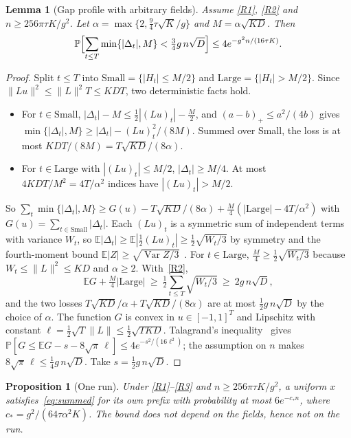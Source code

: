 \documentclass[11pt,a4paper]{article}
\newtheorem{lemma}[theorem]{Lemma}
\newtheorem{proposition}[theorem]{Proposition}
\theoremstyle{definition}
\theoremstyle{remark}
\newcommand{\E}{\mathbb E}
\newcommand{\Prb}{\mathbb P}
\begin{document}
\begin{lemma}[Gap profile with arbitrary fields]\label{lem:profile}
Assume \eqref{R1}, \eqref{R2} and $n\ge256\pi\tau K/g^2$. Let
$\alpha=\max\{2,\frac94\tau\sqrt K/g\}$ and $M=\alpha\sqrt{KD}$. Then
\[
 \Prb\Bigl[\sum_{t\le T}\min\{|\Delta_t|,M\}<\tfrac34g\,n\sqrt D\Bigr]
 \le4e^{-g^2n/(16\tau K)} .
\]
\end{lemma}

\begin{proof}
Split $t\le T$ into $\mathrm{Small}=\{|H_t|\le M/2\}$ and
$\mathrm{Large}=\{|H_t|>M/2\}$. Since $\|Lu\|^2\le\|L\|^2T\le KDT$, two
deterministic facts hold.
\begin{itemize}
 \item For $t\in\mathrm{Small}$, $|\Delta_t|-M\le\frac12|(Lu)_t|-\frac M2$,
 and $(a-b)_+\le a^2/(4b)$ gives
 $\min\{|\Delta_t|,M\}\ge|\Delta_t|-(Lu)_t^2/(8M)$. Summed over Small, the
 loss is at most $KDT/(8M)=T\sqrt{KD}/(8\alpha)$.
 \item For $t\in\mathrm{Large}$ with $|(Lu)_t|\le M/2$,
 $|\Delta_t|\ge M/4$. At most $4KDT/M^2=4T/\alpha^2$ indices have
 $|(Lu)_t|>M/2$.
\end{itemize}
So $\sum_t\min\{|\Delta_t|,M\}\ge G(u)-T\sqrt{KD}/(8\alpha)+\frac
M4(|\mathrm{Large}|-4T/\alpha^2)$ with $G(u)=\sum_{t\in\mathrm{Small}}|\Delta_t|$.
Each $(Lu)_t$ is a symmetric sum of independent terms with variance $W_t$, so
$\E|\Delta_t|\ge\E|\frac12(Lu)_t|\ge\frac12\sqrt{W_t/3}$ by symmetry and the
fourth-moment bound $\E|Z|\ge\sqrt{\operatorname{Var}Z/3}$~\cite{EE}. For
$t\in\mathrm{Large}$, $\frac M4\ge\frac12\sqrt{W_t/3}$ because
$W_t\le\|L\|^2\le KD$ and $\alpha\ge2$. With~\eqref{R2},
\[
 \E G+\tfrac M4|\mathrm{Large}|\ \ge\ \tfrac12\sum_{t\le T}\sqrt{W_t/3}
 \ \ge\ 2g\,n\sqrt D ,
\]
and the two losses $T\sqrt{KD}/\alpha+T\sqrt{KD}/(8\alpha)$ are at most
$\frac12g\,n\sqrt D$ by the choice of $\alpha$. The function $G$ is convex in
$u\in[-1,1]^T$ and Lipschitz with constant
$\ell=\frac12\sqrt T\|L\|\le\frac12\sqrt{TKD}$. Talagrand's
inequality~\cite{Tal95} gives $\Prb[G\le\E G-s-8\sqrt\pi\,\ell]\le
4e^{-s^2/(16\ell^2)}$; the assumption on $n$ makes $8\sqrt\pi\,\ell\le\frac14
g\,n\sqrt D$. Take $s=\frac12g\,n\sqrt D$.
\end{proof}

\begin{proposition}[One run]\label{prop:run}
Under \eqref{R1}--\eqref{R3} and $n\ge256\pi\tau K/g^2$, a uniform $x$
satisfies~\eqref{eq:summed} for its own prefix with probability at most
$6e^{-c_*n}$, where $c_*=g^2/(64\tau\alpha^2K)$. The bound does not depend on the
fields, hence not on the run.
\end{proposition}
\end{document}
